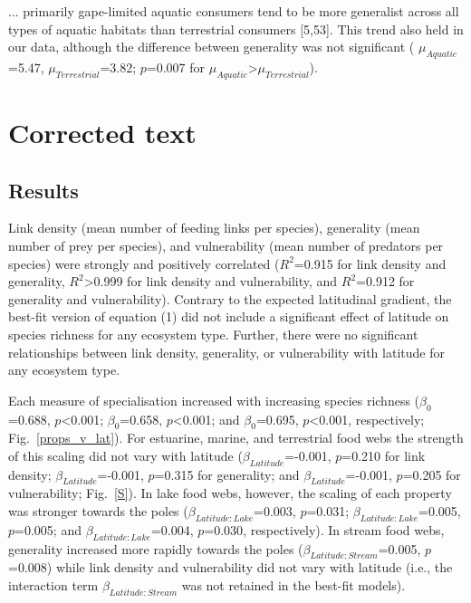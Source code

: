 \documentclass[12pt]{article}
\begin{document}
\begin{spacing}{2.0}
    ... primarily gape-limited aquatic consumers tend to be more
    generalist across all types of aquatic habitats than terrestrial 
    consumers [5,53]. This trend also held in our data, although the difference between generality was not significant (
    $\mu_{Aquatic}$=5.47, $\mu_{Terrestrial}$=3.82; $p$=0.007 for $\mu_{Aquatic}$\textgreater$\mu_{Terrestrial}$). 



\section*{Corrected text} 

  \subsection*{Results}

    Link density (mean number of feeding links per species), generality (mean
    number of prey per species), and vulnerability (mean number of predators per
    species) were strongly and positively correlated ($R^2$=0.915 for link
    density and generality, $R^2$\textgreater0.999 for link density and
    vulnerability, and $R^2$=0.912 for generality and vulnerability). Contrary
    to the expected latitudinal gradient, the best-fit version of
    equation (1) did not include a significant
    effect of latitude on species richness for any ecosystem type. Further, there were no significant
    relationships between link density, generality, or vulnerability with
    latitude for any ecosystem type.


    Each measure of specialisation increased with increasing
    species richness ($\beta_0$=0.688, $p$\textless0.001; $\beta_0$=0.658,
    $p$\textless0.001; and $\beta_0$=0.695, $p$\textless0.001, respectively;
    Fig.~\ref{props_v_lat}). For estuarine, marine, and terrestrial food webs the
    strength of this scaling did not vary with latitude
    ($\beta_{Latitude}$=-0.001, $p$=0.210 for link density;
    $\beta_{Latitude}$=-0.001, $p$=0.315 for generality; and
    $\beta_{Latitude}$=-0.001, $p$=0.205 for vulnerability; Fig.~\ref{S}). In
    lake food webs, however, the scaling of each property was stronger towards
    the poles ($\beta_{Latitude:Lake}$=0.003, $p$=0.031;
    $\beta_{Latitude:Lake}$=0.005, $p$=0.005; and
    $\beta_{Latitude:Lake}$=0.004, $p$=0.030, respectively). In stream food
    webs, generality increased more rapidly towards the poles
    ($\beta_{Latitude:Stream}$=0.005, $p$=0.008) while link density and
    vulnerability did not vary with latitude (i.e., the interaction term 
    $\beta_{Latitude:Stream}$ was not retained in the best-fit models).



\end{spacing}
\end{document}
